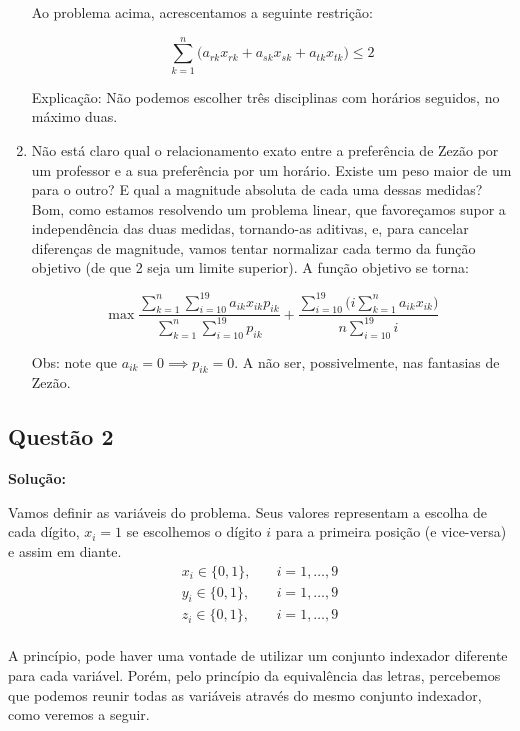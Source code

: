 \documentclass{article}
\begin{document}
\begin{enumerate}[label=(\roman*)]
    Ao problema acima, acrescentamos a seguinte restrição:

    \[
        \sum_{k = 1}^{n} \bigl(a_{rk}x_{rk} + a_{sk}x_{sk} + a_{tk}x_{tk}\bigr) \leq 2
    \]

    Explicação: Não podemos escolher três disciplinas com horários seguidos, no máximo duas.

    \item Não está claro qual o relacionamento exato entre a preferência de Zezão por um professor e a sua preferência por um horário. Existe um peso maior de um para o outro? E qual a magnitude absoluta de cada uma dessas medidas? Bom, como estamos resolvendo um 
    problema linear, que favoreçamos supor a independência das duas medidas, tornando-as aditivas, e, para cancelar diferenças de magnitude, vamos tentar normalizar cada termo da função objetivo (de que 2 seja um limite superior). A função objetivo se torna:
    
    \[
        \max \frac
            {\sum_{k = 1}^{n} \sum_{i = 10}^{19} a_{ik} x_{ik} p_{ik}}
            {\sum_{k = 1}^{n} \sum_{i = 10}^{19} p_{ik}}
            +
        \frac
            {\sum_{i = 10}^{19}\bigl(i\sum_{k = 1}^{n}  a_{ik} x_{ik}\bigr)}
            {n\sum_{i = 10}^{19} i} 
    \]

    Obs: note que $a_{ik} = 0 \implies p_{ik} = 0$. A não ser, possivelmente, nas fantasias de Zezão.
\end{enumerate}


\subsection*{Questão 2}

\textbf{Solução:}

Vamos definir as variáveis do problema. Seus valores representam a escolha de cada dígito, $x_i = 1$ se escolhemos o dígito $i$ para a primeira posição (e vice-versa) e assim em diante. 
\begin{align*}
    x_i \in \{0,1\},&\quad i = 1,\dots,9\\
    y_i \in \{0,1\},&\quad i = 1,\dots,9\\
    z_i \in \{0,1\},&\quad i = 1,\dots,9\\
\end{align*}

A princípio, pode haver uma vontade de utilizar um conjunto indexador diferente para cada variável. Porém, pelo princípio da equivalência das letras, percebemos que podemos reunir todas as variáveis através do mesmo conjunto indexador, como veremos a seguir.
\end{document}
